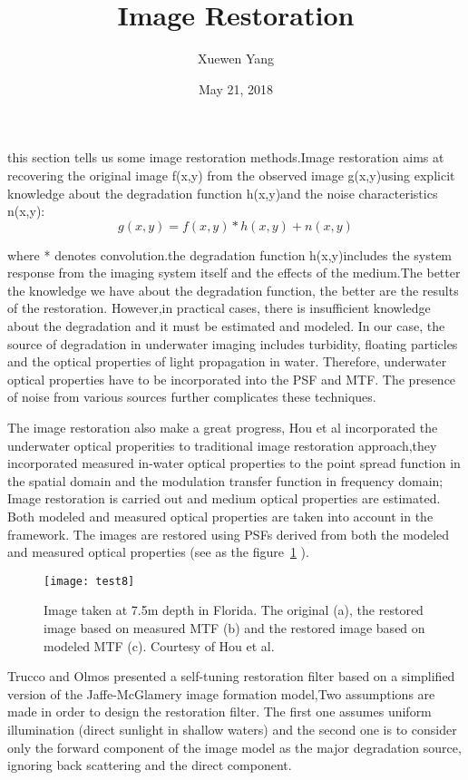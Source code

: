\documentclass{article}
\author{Xuewen Yang}
\date{May 21, 2018}
\title{Image Restoration}
\begin{document}
\maketitle
this section tells us some image restoration methods.Image restoration aims at recovering the original image f(x,y) from the observed image g(x,y)using explicit knowledge about the degradation function h(x,y)and the noise characteristics n(x,y):
\begin{equation}
g(x,y)=f(x,y)*h(x,y)+n(x,y)\label{eq:commutation}
\end{equation}

where * denotes convolution.the degradation function h(x,y)includes the system response from the imaging system itself and the effects of the medium.The better the knowledge we have about the degradation function, the better are the results of the restoration. However,in practical cases, there is insufficient knowledge about the degradation and it must be estimated and modeled. In our case, the source of degradation in underwater imaging includes turbidity, floating particles and the optical properties of light propagation in water. Therefore, underwater optical properties have to be incorporated into the PSF and MTF. The presence of noise from various sources further complicates these techniques.

The image restoration also make a great progress, Hou et al\cite{Hou2008Automated} incorporated the underwater optical properities to traditional image restoration approach,they incorporated measured in-water optical properties to the point spread function in the spatial domain and the modulation transfer function in frequency domain; Image restoration is carried out and medium optical properties are estimated. Both modeled and measured optical properties are taken into account in the framework. The images are restored using PSFs derived from both the modeled and measured optical properties (see as the figure~\ref{fig:1} ).
\begin{figure}[htbp]
\centering
\texttt{[image: test8]}
\caption{Image taken at 7.5m depth in Florida. The original (a), the restored image based on measured MTF (b) and the restored image based on modeled MTF (c). Courtesy of Hou et al.}
\label{fig:1}
\end{figure}

Trucco and Olmos \cite{Trucco2006Self}presented a self-tuning restoration filter based on a simplified version of the Jaffe-McGlamery image formation model,Two assumptions are
made in order to design the restoration filter. The first one assumes uniform illumination (direct sunlight in shallow waters) and the second one is to consider only the forward component of the image model as the major degradation source, ignoring back scattering and the direct component.

\end{document}
